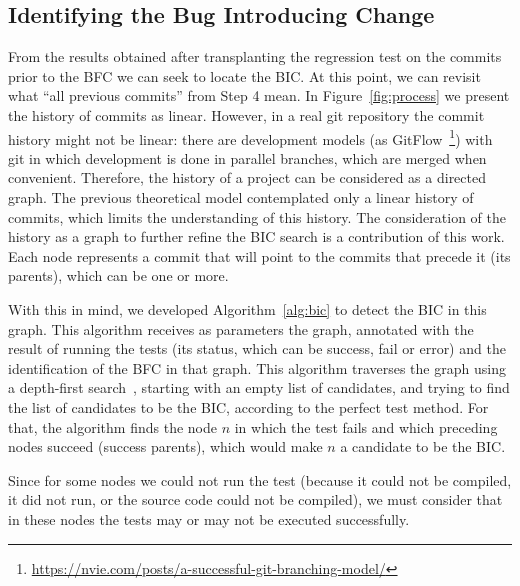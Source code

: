 \subsection{Identifying the Bug Introducing Change}
\label{subsec:identify-bic}

From the results obtained after transplanting the regression test on the commits prior to the BFC we can seek to locate the BIC.
At this point, we can revisit what ``all previous commits'' from Step 4 mean. 
In Figure~\ref{fig:process} we present the history of commits as linear. 
However, in a real git repository the commit history might not be linear: there are development models (as GitFlow~\footnote{\url{https://nvie.com/posts/a-successful-git-branching-model/}}) with git in which development is done in parallel branches, which are merged when convenient. 
Therefore, the history of a project can be considered as a directed graph. 
The previous theoretical model contemplated only a linear history of commits, which limits the understanding of this history. The consideration of the history as a graph to further refine the BIC search is a contribution of this work.
Each node represents a commit that will point to the commits that precede it (its parents), which can be one or more.

With this in mind, we developed Algorithm~\ref{alg:bic} to detect the BIC in this graph. 
This algorithm receives as parameters the graph, annotated with the result of running the tests (its status, which can be success, fail or error) and the identification of the BFC in that graph. 
This algorithm traverses the graph using a depth-first search~\cite{cormen2022depthfirstsearch}, starting with an empty list of candidates, and trying to find the list of candidates to be the BIC, according to the perfect test method. 
For that, the algorithm finds the node $n$ in which the test fails and which preceding nodes succeed (success parents), which would make $n$ a candidate to be the BIC.

Since for some nodes we could not run the test (because it could not be compiled, it did not run, or the source code could not be compiled), we must consider that in these nodes the tests may or may not be executed successfully.


